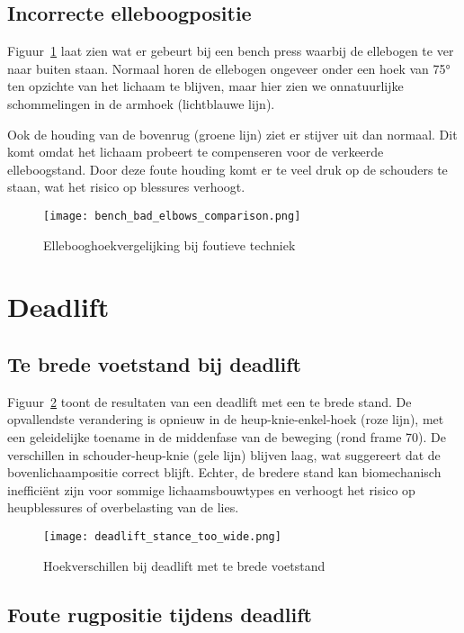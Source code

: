 \subsection{Incorrecte elleboogpositie}

Figuur~\ref{fig:bad_elbows} laat zien wat er gebeurt bij een bench press waarbij de ellebogen te ver naar buiten staan. 
Normaal horen de ellebogen ongeveer onder een hoek van 75° ten opzichte van het lichaam te blijven, maar hier zien we onnatuurlijke schommelingen in de armhoek (lichtblauwe lijn).

Ook de houding van de bovenrug (groene lijn) ziet er stijver uit dan normaal. 
Dit komt omdat het lichaam probeert te compenseren voor de verkeerde elleboogstand. 
Door deze foute houding komt er te veel druk op de schouders te staan, wat het risico op blessures verhoogt.

\begin{figure}[H]
\centering
\texttt{[image: bench\_bad\_elbows\_comparison.png]}
\caption{Ellebooghoekvergelijking bij foutieve techniek}
\label{fig:bad_elbows}
\end{figure}

\section{Deadlift}
\subsection{Te brede voetstand bij deadlift}

Figuur~\ref{fig:deadlift_stance_wide} toont de resultaten van een deadlift met een te brede stand.
De opvallendste verandering is opnieuw in de heup-knie-enkel-hoek (roze lijn), met een geleidelijke toename in de middenfase van de beweging (rond frame 70). 
De verschillen in schouder-heup-knie (gele lijn) blijven laag, wat suggereert dat de bovenlichaampositie correct blijft.
Echter, de bredere stand kan biomechanisch inefficiënt zijn voor sommige lichaamsbouwtypes en verhoogt het risico op heupblessures of overbelasting van de lies.

\begin{figure}[H]
\centering
\texttt{[image: deadlift\_stance\_too\_wide.png]}
\caption{Hoekverschillen bij deadlift met te brede voetstand}
\label{fig:deadlift_stance_wide}
\end{figure}

\subsection{Foute rugpositie tijdens deadlift}

